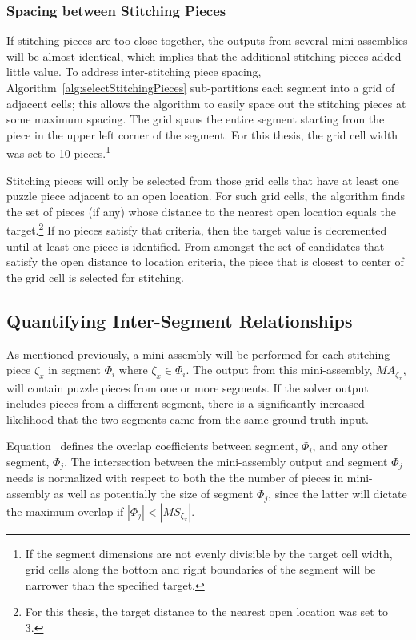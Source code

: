 \subsubsection{Spacing between Stitching Pieces}\label{sec:spacingBetweenStitchingPieces}

If stitching pieces are too close together, the outputs from several mini-assemblies will be almost identical, which implies that the additional stitching pieces added little value.  To address inter-stitching piece spacing, Algorithm~\ref{alg:selectStitchingPieces} sub-partitions each segment into a grid of adjacent cells; this allows the algorithm to easily space out the stitching pieces at some maximum spacing.  The grid spans the entire segment starting from the piece in the upper left corner of the segment.  For this thesis, the grid cell width was set to 10 pieces.\footnote{If the segment dimensions are not evenly divisible by the target cell width, grid cells along the bottom and right boundaries of the segment will be narrower than the specified target.} 

Stitching pieces will only be selected from those grid cells that have at least one puzzle piece adjacent to an open location. For such grid cells, the algorithm finds the set of pieces (if any) whose distance to the nearest open location equals the target.\footnote{For this thesis, the target distance to the nearest open location was set to 3.}  If no pieces satisfy that criteria, then the target value is decremented until at least one piece is identified. From amongst the set of candidates that satisfy the open distance to location criteria, the piece that is closest to center of the grid cell is selected for stitching. 

\subsection{Quantifying Inter-Segment Relationships}

As mentioned previously, a mini-assembly will be performed for each stitching piece $\zeta_x$ in segment $\Phi_i$ where $\zeta_x \in \Phi_i$.  The output from this mini-assembly, $MA_{\zeta_x}$, will contain puzzle pieces from one or more segments.  If the solver output includes pieces from a different segment, there is a significantly increased likelihood that the two segments came from the same ground-truth input. 

Equation~ defines the overlap coefficients between segment, $\Phi_i$, and any other segment, $\Phi_j$. The intersection between the mini-assembly output and segment $\Phi_j$ needs is normalized with respect to both the the number of pieces in mini-assembly as well as potentially the size of segment $\Phi_j$, since the latter will dictate the maximum overlap if $|\Phi_j| < |MS_{\zeta_x}|$.  

